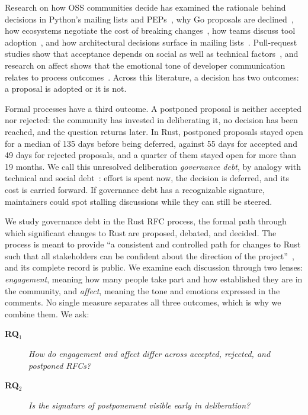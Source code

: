 \documentclass[conference]{IEEEtran}
\begin{document}
Research on how OSS communities decide has examined the rationale behind decisions in Python's mailing lists and PEPs~\cite{9402135, https://doi.org/10.1002/spe.3128, sharma2024decisions}, why Go proposals are declined~\cite{kondo2025empirical}, how ecosystems negotiate the cost of breaking changes~\cite{bogart2016break}, how teams discuss tool adoption~\cite{yin2020team}, and how architectural decisions surface in mailing lists~\cite{soliman2024exploring}. Pull-request studies show that acceptance depends on social as well as technical factors~\cite{tsay2014influence, gousios2015work}, and research on affect shows that the emotional tone of developer communication relates to process outcomes~\cite{murgia2014developers, ortu2015bullies, novielli2019sentiment}. Across this literature, a decision has two outcomes: a proposal is adopted or it is not.

Formal processes have a third outcome. A postponed proposal is neither accepted nor rejected: the community has invested in deliberating it, no decision has been reached, and the question returns later. In Rust, postponed proposals stayed open for a median of 135 days before being deferred, against 55 days for accepted and 49 days for rejected proposals, and a quarter of them stayed open for more than 19 months. We call this unresolved deliberation \emph{governance debt}, by analogy with technical and social debt~\cite{tamburri2013social}: effort is spent now, the decision is deferred, and its cost is carried forward. If governance debt has a recognizable signature, maintainers could spot stalling discussions while they can still be steered.

We study governance debt in the Rust RFC process, the formal path through which significant changes to Rust are proposed, debated, and decided. The process is meant to provide ``a consistent and controlled path for changes to Rust such that all stakeholders can be confident about the direction of the project''~\cite{RustRFC2024}, and its complete record is public. We examine each discussion through two lenses: \emph{engagement}, meaning how many people take part and how established they are in the community, and \emph{affect}, meaning the tone and emotions expressed in the comments. No single measure separates all three outcomes, which is why we combine them. We ask:

\begin{description}
    \item[\textbf{RQ$_1$}] \textit{How do engagement and affect differ across accepted, rejected, and postponed RFCs?}
    \item[\textbf{RQ$_2$}] \textit{Is the signature of postponement visible early in deliberation?}
\end{description}
\end{document}
